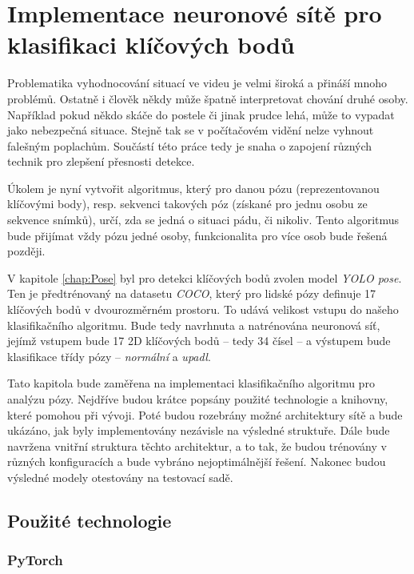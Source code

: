 \chapter{Implementace neuronové sítě pro klasifikaci klíčových bodů}
\label{chap:ClassificationImplementation}

Problematika vyhodnocování situací ve videu je velmi široká a přináší mnoho
problémů. Ostatně i člověk někdy může špatně interpretovat chování druhé osoby.
Například pokud někdo skáče do postele či jinak prudce lehá, může to vypadat
jako nebezpečná situace. Stejně tak se v počítačovém vidění nelze vyhnout
falešným poplachům. Součástí této práce tedy je snaha o zapojení různých
technik pro zlepšení přesnosti detekce.

Úkolem je nyní vytvořit algoritmus, který pro danou pózu (reprezentovanou
klíčovými body), resp. sekvenci takových póz (získané pro jednu osobu ze
sekvence snímků), určí, zda se jedná o situaci pádu, či nikoliv. Tento
algoritmus bude přijímat vždy pózu jedné osoby, funkcionalita pro více osob
bude řešená později.

V kapitole \ref{chap:Pose} byl pro detekci klíčových bodů zvolen model
\textit{YOLO pose}. Ten je předtrénovaný na datasetu \textit{COCO}, který pro
lidské pózy definuje 17 klíčových bodů v dvourozměrném prostoru. To udává
velikost vstupu do našeho klasifikačního algoritmu. Bude tedy navrhnuta a
natrénována neuronová síť, jejímž vstupem bude 17 2D klíčových bodů – tedy 34
čísel – a výstupem bude klasifikace třídy pózy – \textit{normální} a
\textit{upadl}.

Tato kapitola bude zaměřena na implementaci klasifikačního algoritmu pro
analýzu pózy. Nejdříve budou krátce popsány použité technologie a knihovny,
které pomohou při vývoji. Poté budou rozebrány možné architektury sítě a bude
ukázáno, jak byly implementovány nezávisle na výsledné struktuře. Dále bude
navržena vnitřní struktura těchto architektur, a to tak, že budou trénovány v
různých konfiguracích a bude vybráno nejoptimálnější řešení. Nakonec budou
výsledné modely otestovány na testovací sadě.

\section{Použité technologie}

\subsection{PyTorch}


